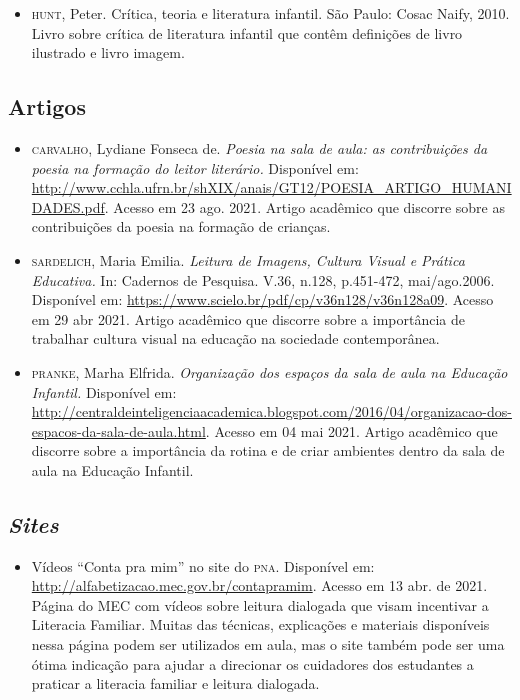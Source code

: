 \documentclass[11pt]{extarticle}
\begin{document}
\begin{enumerate}
\begin{itemize}
\item \textsc{hunt}, Peter. Crítica, teoria e literatura infantil. São Paulo: Cosac Naify, 2010.
Livro sobre crítica de literatura infantil que contêm definições de livro ilustrado e livro imagem. 
\end{itemize}

\subsection{Artigos}

\begin{itemize}

	\item \textsc{carvalho}, Lydiane Fonseca de. \emph{Poesia na sala de aula: as contribuições da poesia na formação
	do leitor literário.} Disponível em: \url{http://www.cchla.ufrn.br/shXIX/anais/GT12/POESIA_ARTIGO_HUMANIDADES.pdf}. Acesso em 23 ago. 2021.
	Artigo acadêmico que discorre sobre as contribuições da poesia na formação de crianças.
	\item \textsc{sardelich}, Maria Emilia. \emph{Leitura de Imagens, Cultura Visual e Prática Educativa.} 
In: Cadernos de Pesquisa. V.36, n.128, p.451-472, mai/ago.2006. Disponível em: \url{https://www.scielo.br/pdf/cp/v36n128/v36n128a09}. 
Acesso em 29 abr 2021. 
Artigo acadêmico que discorre sobre a importância de trabalhar cultura 
visual na educação na sociedade contemporânea. 

\item \textsc{pranke}, Marha Elfrida. \emph{Organização dos espaços da sala de aula na Educação Infantil.} Disponível em: 
\url{http://centraldeinteligenciaacademica.blogspot.com/2016/04/organizacao-dos-espacos-da-sala-de-aula.html}. Acesso em 04 mai 2021. 
Artigo acadêmico que discorre sobre a importância da rotina e de criar ambientes dentro da sala de aula na Educação Infantil.  
\end{itemize}

\subsection{\textit{Sites}}

\begin{itemize}
\item Vídeos “Conta pra mim” no site do \textsc{pna}. Disponível em: \url{http://alfabetizacao.mec.gov.br/contapramim}. 
Acesso em 13 abr. de 2021.
Página do MEC com vídeos sobre leitura dialogada que visam incentivar a Literacia Familiar. Muitas das 
técnicas, explicações e materiais disponíveis nessa página podem ser utilizados em aula, mas o site também 
pode ser uma ótima indicação para ajudar a direcionar os cuidadores dos estudantes a praticar 
a literacia familiar e leitura dialogada.


\end{itemize}
\end{enumerate}
\end{document}
